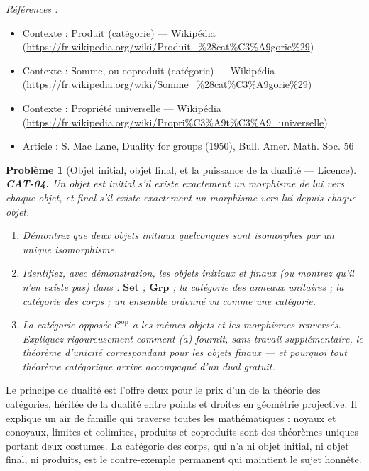 \documentclass[11pt]{article}
\newtheorem{problem}{Problème}
\newenvironment{refs}{\par\small\noindent\emph{Références :}\begin{itemize}\setlength\itemsep{0pt}}{\end{itemize}\normalsize}
\begin{document}
\begin{refs}
\item Contexte : Produit (catégorie) --- Wikipédia (\url{https://fr.wikipedia.org/wiki/Produit_%28cat%C3%A9gorie%29})
\item Contexte : Somme, ou coproduit (catégorie) --- Wikipédia (\url{https://fr.wikipedia.org/wiki/Somme_%28cat%C3%A9gorie%29})
\item Contexte : Propriété universelle --- Wikipédia (\url{https://fr.wikipedia.org/wiki/Propri%C3%A9t%C3%A9_universelle})
\item Article : S. Mac Lane, \og{} Duality for groups \fg{} (1950), Bull. Amer. Math. Soc. 56
\end{refs}

\bigskip

\begin{problem}[{Objet initial, objet final, et la puissance de la dualité --- Licence}]
\textbf{CAT-04.} Un objet est \textit{initial} s'il existe exactement un
morphisme de lui vers chaque objet, et \textit{final} s'il existe exactement un morphisme vers lui
depuis chaque objet.
\begin{enumerate}
\item[(a)] Démontrez que deux objets initiaux quelconques sont isomorphes par un unique
isomorphisme.
\item[(b)] Identifiez, avec démonstration, les objets initiaux et finaux (ou montrez qu'il n'en existe
pas) dans : $ \mathbf{Set} $ ; $ \mathbf{Grp} $ ; la catégorie des anneaux unitaires ; la
catégorie des corps ; un ensemble ordonné vu comme une catégorie.
\item[(c)] La \textit{catégorie opposée}
$ \mathcal{C}^{\mathrm{op}} $ a les mêmes objets et les morphismes renversés. Expliquez
rigoureusement comment (a) fournit, sans travail supplémentaire, le théorème d'unicité
correspondant pour les objets finaux --- et pourquoi tout théorème catégorique arrive accompagné
d'un dual gratuit.
\end{enumerate}

\end{problem}

\noindent Le principe de dualité est l'offre \og{} deux pour le prix d'un \fg{} de la théorie des
catégories, héritée de la dualité entre points et droites en géométrie projective. Il explique un
air de famille qui traverse toutes les mathématiques : noyaux et conoyaux, limites et colimites,
produits et coproduits sont des théorèmes uniques portant deux costumes. La catégorie des corps,
qui n'a ni objet initial, ni objet final, ni produits, est le contre-exemple permanent qui
maintient le sujet honnête.
\end{document}
